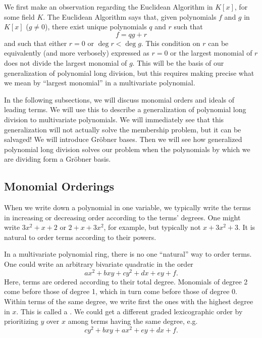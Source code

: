 We first make an observation regarding the Euclidean Algorithm in $K[x]$, for some field $K$.
The Euclidean Algorithm says that, given polynomials $f$ and $g$ in $K[x]$ ($g \neq 0$),
there exist unique polynomials $q$ and $r$ such that
  \[ f = qg + r \]
and such that either $r = 0$ or $\deg r < \deg g$.
This condition on $r$ can be equivalently (and more verbosely) expressed as
$r = 0$ or the largest monomial of $r$ does not divide the largest monomial of $g$.
This will be the basis of our generalization of polynomial long division,
but this requires making precise what we mean by ``largest monomial'' in a multivariate polynomial.

In the following subsections, we will discuss monomial orders and ideals of leading terms.
We will use this to describe a generalization of polynomial long division to multivariate polynomials.
We will immediately see that this generalization will not actually solve the membership problem, but it can be salvaged!
We will introduce Gr\"obner bases.
Then we will see how generalized polynomial long division solves our problem when the polynomials by which we are dividing form a Gr\"obner basis.




\subsection{Monomial Orderings}


When we write down a polynomial in one variable, we typically write the terms in increasing or decreasing order according to the terms' degrees.
One might write $3x^2 + x + 2$ or $2 + x + 3x^2$, for example, but typically not $x + 3x^2 + 3$.
It is natural to order terms according to their powers.

In a multivariate polynomial ring, there is no one ``natural'' way to order terms.
One could write an arbitrary bivariate quadratic in the order
  \[ ax^2 + bxy + cy^2 + dx + ey + f. \]
Here, terms are ordered according to their total degree.
Monomials of degree 2 come before those of degree 1, which in turn come before those of degree 0.
Within terms of the same degree, we write first the ones with the highest degree in $x$.
This is called a .
We could get a different graded lexicographic order by prioritizing $y$ over $x$ among terms having the same degree, e.g.
  \[ cy^2 + bxy + ax^2 + ey + dx + f. \]

